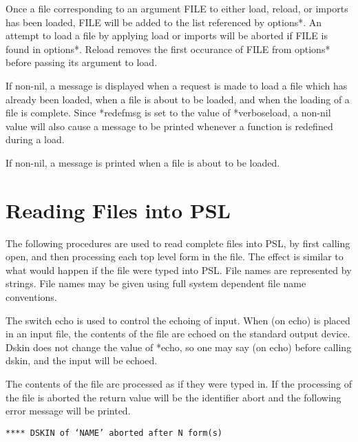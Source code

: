 {
    Once  a  file  corresponding  to  an argument FILE to either
    load, reload, or imports has been loaded, FILE will be added
    to the list referenced by options*.  An attempt  to  load  a
    file  by applying load or imports will be aborted if FILE is
    found in options*.  Reload removes the  first  occurance  of
    FILE from options* before passing its argument to load.
}

{
    If non-nil, a message is displayed when a request is made to
    load  a  file  which has already been loaded, when a file is
    about to be loaded, and  when  the  loading  of  a  file  is
    complete.      Since  *redefmsg  is  set  to  the  value  of
    *verboseload, a non-nil value  will also cause a message  to
    be printed whenever a function is redefined during a load.
}

{
    If  non-nil, a message is printed when a file is about to be
    loaded.
}

\section{Reading Files into PSL}

The following procedures are used to read complete files  into
PSL,  by  first calling open, and then processing each top level
form in the file.  The effect is similar to what would happen if
the file were typed into PSL.  File  names  are  represented  by
strings.    File  names may be given using full system dependent
file name conventions.

{
    The switch echo is used to control  the  echoing  of  input.
    When  (on  echo) is placed in an input file, the contents of
    the file are echoed on the standard output  device.    Dskin
    does not change the value of *echo, so one may say (on echo)
    before calling dskin, and the input will be echoed.
}

{    The contents of the file are processed as if they were typed
    in.    If  the  processing of the file is aborted the return
    value will be the identifier abort and the  following  error
    message will be printed.
}

{\tt   ***** DSKIN of `NAME' aborted after N form(s) }\\

